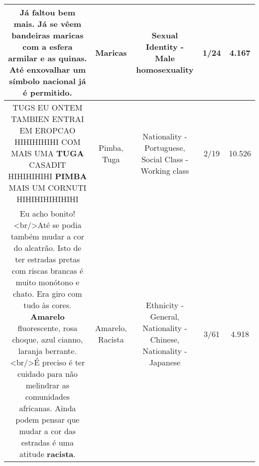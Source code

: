 \documentclass[11pt]{article}
\newlength\mylength
\begin{document}
\begin{center}
\begin{longtable}{|C{.65\mylength}|C{.30\mylength}|C{.12\mylength}|C{.12\mylength}|C{.12\mylength}|}
  \small Já faltou bem mais. Já se vêem bandeiras \textbf{maricas} com a esfera armilar e as quinas. Até enxovalhar um símbolo nacional já é permitido.\normalsize   & Maricas & Sexual Identity - Male homosexuality & 1/24 & 4.167 \\  \hline
  \small TUGS EU ONTEM TAMBIEN ENTRAI EM EROPCAO HIHIHIHIHI COM MAIS UMA \textbf{TUGA} CASADIT HIHIHIHIHI \textbf{PIMBA} MAIS UM CORNUTI HIHIHIHIHIHIHI\normalsize   & Pimba, Tuga & Nationality - Portuguese, Social Class - Working class & 2/19 & 10.526 \\  \hline
  \small Eu acho bonito!<br/>Até se podia também mudar a cor do alcatrão. Isto de ter estradas pretas com riscas brancas é muito monótono e chato. Era giro com tudo às cores. \textbf{A\textbf{marelo}} fluorescente, rosa choque, azul cianno, laranja berrante.<br/>É preciso é ter cuidado para não melindrar as comunidades africanas. Ainda podem pensar que mudar a cor das estradas é uma atitude \textbf{racista}.\normalsize   & Amarelo, Racista & Ethnicity - General, Nationality - Chinese, Nationality - Japanese & 3/61 & 4.918 \\  \hline
  
\end{longtable}
\end{center}
\end{document}
